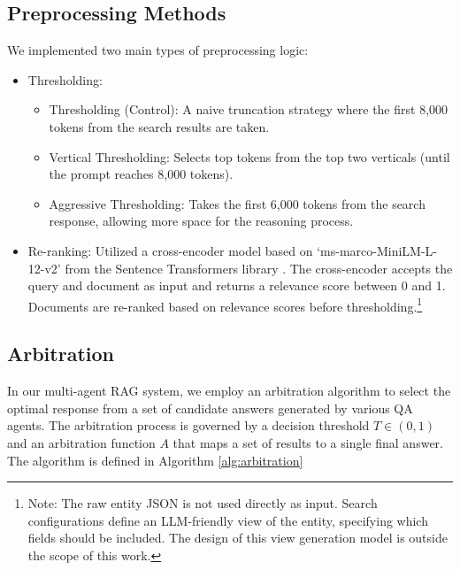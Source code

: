 \documentclass[sigconf,nonacm]{acmart}
\begin{document}
\subsection{Preprocessing Methods}
We implemented two main types of preprocessing logic:
\begin{itemize}

\item Thresholding:
    \begin{itemize}
    \item Thresholding (Control): A naive truncation strategy where the first 8,000 tokens from the search results are taken.
    \item Vertical Thresholding: Selects top tokens from the top two verticals (until the prompt reaches 8,000 tokens).
    \item Aggressive Thresholding: Takes the first 6,000 tokens from the search response, allowing more space for the reasoning process.
    \end{itemize}
\item Re-ranking: Utilized a cross-encoder model based on `ms-marco-MiniLM-L-12-v2' from the Sentence Transformers library \cite{sentence-bert}.  The cross-encoder accepts the query and document as input and returns a relevance score between 0 and 1.  Documents are re-ranked based on relevance scores before thresholding.\footnote{Note: The raw entity JSON is not used directly as input. Search configurations define an LLM-friendly view of the entity, specifying which fields should be included. The design of this view generation model is outside the scope of this work.}
\end{itemize}




\subsection{Arbitration}
In our multi-agent RAG system, we employ an arbitration algorithm to select the optimal response from a set of candidate answers generated by various QA agents. The arbitration process is governed by a decision threshold $T\in(0,1)$ and an arbitration function $A$ that maps a set of results to a single final answer.  The algorithm is defined in Algorithm \ref{alg:arbitration}
\end{document}
